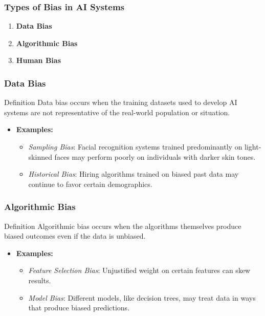 \documentclass{beamer}
\begin{document}
\begin{frame}[fragile]
    \frametitle{Types of Bias in AI Systems}
    \begin{enumerate}
        \item \textbf{Data Bias}
        \item \textbf{Algorithmic Bias}
        \item \textbf{Human Bias}
    \end{enumerate}
\end{frame}

\begin{frame}[fragile]
    \frametitle{Data Bias}
    \begin{block}{Definition}
        Data bias occurs when the training datasets used to develop AI systems are not representative of the real-world population or situation.
    \end{block}
    \begin{itemize}
        \item \textbf{Examples:}
        \begin{itemize}
            \item \textit{Sampling Bias}: Facial recognition systems trained predominantly on light-skinned faces may perform poorly on individuals with darker skin tones.
            \item \textit{Historical Bias}: Hiring algorithms trained on biased past data may continue to favor certain demographics.
        \end{itemize}
    \end{itemize}
\end{frame}

\begin{frame}[fragile]
    \frametitle{Algorithmic Bias}
    \begin{block}{Definition}
        Algorithmic bias occurs when the algorithms themselves produce biased outcomes even if the data is unbiased.
    \end{block}
    \begin{itemize}
        \item \textbf{Examples:}
        \begin{itemize}
            \item \textit{Feature Selection Bias}: Unjustified weight on certain features can skew results.
            \item \textit{Model Bias}: Different models, like decision trees, may treat data in ways that produce biased predictions.
        \end{itemize}
    \end{itemize}
\end{frame}
\end{document}
